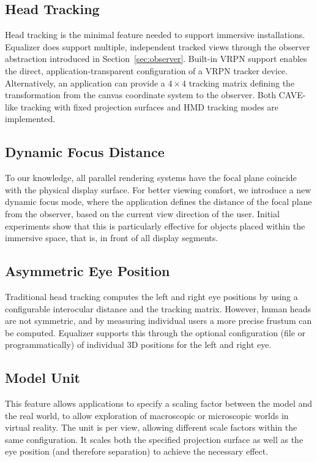 \documentclass[10pt,journal,compsoc]{IEEEtran}
\newcommand{\sref}[1]{Section~\ref{#1}}
\begin{document}
\subsection{Head Tracking}

Head tracking is the minimal feature needed to support immersive
installations. Equalizer does support multiple, independent tracked views
through the observer abstraction introduced in \sref{sec:observer}. Built-in
VRPN support enables the direct, application-transparent configuration of a VRPN
tracker device. Alternatively, an application can provide a $4\times 4$ tracking
matrix defining the transformation from the canvas coordinate system to the
observer. Both CAVE-like tracking with fixed projection surfaces and HMD
tracking modes are implemented.

\subsection{Dynamic Focus Distance}

To our knowledge, all parallel rendering systems have the focal plane coincide
with the physical display surface. For better viewing comfort, we introduce a
new dynamic focus mode, where the application defines the distance of the focal
plane from the observer, based on the current view direction of the
user. Initial experiments show that this is particularly effective for objects
placed within the immersive space, that is, in front of all display segments.

\subsection{Asymmetric Eye Position}

Traditional head tracking computes the left and right eye positions by using a
configurable interocular distance and the tracking matrix. However, human heads
are not symmetric, and by measuring individual users a more precise frustum can
be computed. Equalizer supports this through the optional configuration (file or
programmatically) of individual 3D positions for the left and right eye.

\subsection{Model Unit}

This feature allows applications to specify a scaling factor between the model
and the real world, to allow exploration of macroscopic or microscopic worlds in
virtual reality. The unit is per view, allowing different scale factors within
the same configuration. It scales both the specified projection surface as well
as the eye position (and therefore separation) to achieve the necessary effect.
\end{document}
